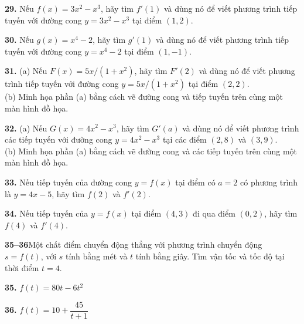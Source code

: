\begin{minipage}[t]{0.48\textwidth}
  \textbf{29.} Nếu $f(x) = 3x^2 - x^3$, hãy tìm $f'(1)$ và dùng nó để viết phương trình tiếp tuyến với đường cong $y = 3x^2 - x^3$ tại điểm $(1, 2)$.
  \vspace{2mm}

  \textbf{30.} Nếu $g(x) = x^4 - 2$, hãy tìm $g'(1)$ và dùng nó để viết phương trình tiếp tuyến với đường cong $y = x^4 - 2$ tại điểm $(1, -1)$.
  \vspace{2mm}

  \textbf{31.} (a) Nếu $F(x) = 5x/(1 + x^2)$, hãy tìm $F'(2)$ và dùng nó để viết phương trình tiếp tuyến với đường cong $y = 5x/(1 + x^2)$ tại điểm $(2, 2)$.\\[1.5mm]
  \leavevmode\llap{\casicon\hspace{4pt}}(b) Minh họa phần (a) bằng cách vẽ đường cong và tiếp tuyến trên cùng một màn hình đồ họa.
  \vspace{2mm}

  \textbf{32.} (a) Nếu $G(x) = 4x^2 - x^3$, hãy tìm $G'(a)$ và dùng nó để viết phương trình các tiếp tuyến với đường cong $y = 4x^2 - x^3$ tại các điểm $(2, 8)$ và $(3, 9)$.\\[1.5mm]
  \leavevmode\llap{\casicon\hspace{4pt}}(b) Minh họa phần (a) bằng cách vẽ đường cong và các tiếp tuyến trên cùng một màn hình đồ họa.
  \vspace{2mm}

  \textbf{33.} Nếu tiếp tuyến của đường cong $y = f(x)$ tại điểm có $a = 2$ có phương trình là $y = 4x - 5$, hãy tìm $f(2)$ và $f'(2)$.
  \vspace{2mm}

  \textbf{34.} Nếu tiếp tuyến của $y = f(x)$ tại điểm $(4, 3)$ đi qua điểm $(0, 2)$, hãy tìm $f(4)$ và $f'(4)$.
  \vspace{2mm}

  {\bfseries\color{stewartcyan} 35--36}\quad Một chất điểm chuyển động thẳng với phương trình chuyển động $s = f(t)$, với $s$ tính bằng mét và $t$ tính bằng giây. Tìm vận tốc và tốc độ tại thời điểm $t = 4$.
  \vspace{1.5mm}

  \noindent
  \begin{minipage}[t]{0.48\linewidth}
    \textbf{35.} $f(t) = 80t - 6t^2$
  \end{minipage}\hfill
  \begin{minipage}[t]{0.48\linewidth}
    \textbf{36.} $f(t) = 10 + \dfrac{45}{t + 1}$
  \end{minipage}
  \vspace{2.5mm}


\end{minipage}
